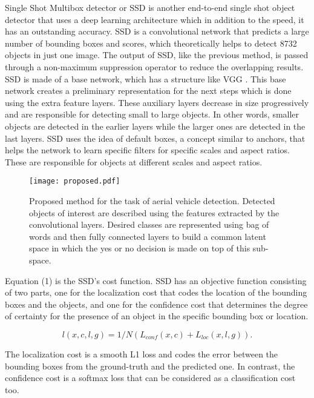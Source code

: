 \documentclass[conference]{IEEEtran}
\begin{document}
Single Shot Multibox detector or SSD \cite{ssd} is another end-to-end single shot object detector that uses a deep learning architecture which in addition to the speed, it has an outstanding accuracy. SSD is a convolutional network that predicts a large number of bounding boxes and scores, which theoretically helps to detect 8732 objects in just one image. The output of SSD, like the previous method, is passed through a non-maximum suppression operator to reduce the overlapping results. SSD is made of a base network, which has a structure like VGG \cite{vgg}. This base network creates a preliminary representation for the next steps which is done using the extra feature layers. These auxiliary layers decrease in size progressively and are responsible for detecting small to large objects. In other words, smaller objects are detected in the earlier layers while the larger ones are detected in the last layers. SSD uses the idea of default boxes, a concept similar to anchors, that helps the network to learn specific filters for specific scales and aspect ratios. These are responsible for objects at different scales and aspect ratios.

\begin{figure*}[!t]
\centering
\texttt{[image: proposed.pdf]}\\
\caption{Proposed method for the task of aerial vehicle detection. Detected objects of interest are described using the features extracted by the convolutional layers. Desired classes are represented using bag of words and then fully connected layers to build a common latent space in which the yes or no decision is made on top of this sub-space.}
\label{fig_graph3}
\end{figure*}

Equation (1) is the SSD's cost function. SSD has an objective function consisting of two parts, one for the localization cost that codes the location of the bounding boxes and the objects, and one for the confidence cost that determines the degree of certainty for the presence of an object in the specific bounding box or location. 

\begin{equation}
l(x,c,l,g)=1/N(L_{conf}(x,c)+{L_{loc}(x,l,g)}).
\end{equation}

The localization cost is a smooth L1 loss and codes the error between the bounding boxes from the ground-truth and the predicted one. In contrast, the confidence cost is a softmax loss that can be considered as a classification cost too. 
\end{document}
